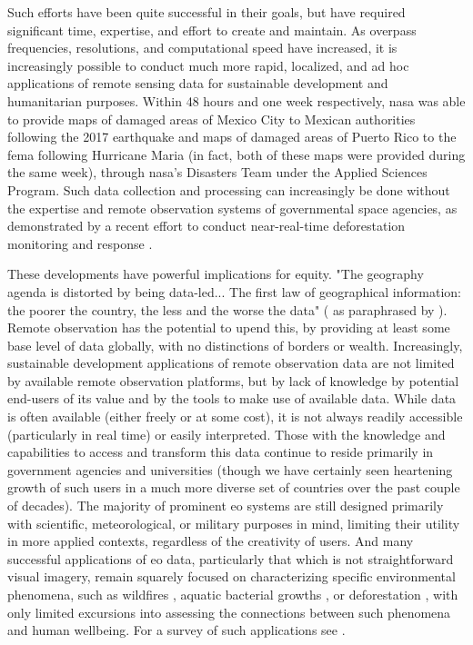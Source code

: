 Such efforts have been quite successful in their goals, but have required significant time, expertise, and effort to create and maintain. As overpass frequencies, resolutions, and computational speed have increased, it is increasingly possible to conduct much more rapid, localized, and ad hoc applications of remote sensing data for sustainable development and humanitarian purposes. Within 48 hours and one week respectively, \ac{nasa} was able to provide maps of damaged areas of Mexico City to Mexican authorities following the 2017 earthquake \cite{nasajetpropulsionlaboratorySatelliteRadarDetects2017} and maps of damaged areas of Puerto Rico to the \ac{fema} following Hurricane Maria \cite{nasajetpropulsionlaboratorySatelliteDataPuerto2017} (in fact, both of these maps were provided during the same week), through \ac{nasa}'s Disasters Team under the Applied Sciences Program. Such data collection and processing can increasingly be done without the expertise and remote observation systems of governmental space agencies, as demonstrated by a recent effort to conduct near-real-time deforestation monitoring and response \cite{finerCombatingDeforestationSatellite2018}.

These developments have powerful implications for equity. "The geography agenda is distorted by being data-led... The first law of geographical information: the poorer the country, the less and the worse the data"  (\cite{overton1991further} as paraphrased by \cite{taylorGeographicInformationSystems1994}). Remote observation has the potential to upend this, by providing at least some base level of data globally, with no distinctions of borders or wealth. Increasingly, sustainable development applications of remote observation data are not limited by available remote observation platforms, but by lack of knowledge by potential end-users of its value and by the tools to make use of available data. While data is often available (either freely or at some cost), it is not always readily accessible (particularly in real time) or easily interpreted. Those with the knowledge and capabilities to access and transform this data continue to reside primarily in government agencies and universities (though we have certainly seen heartening growth of such users in a much more diverse set of countries over the past couple of decades). The majority of prominent \ac{eo} systems are still designed primarily with scientific, meteorological, or military purposes in mind, limiting their utility in more applied contexts, regardless of the creativity of users. And many successful applications of \ac{eo} data, particularly that which is not straightforward visual imagery, remain squarely focused on characterizing specific environmental phenomena, such as wildfires \cite{schroederNewVIIRS375m2014},  aquatic bacterial growths \cite{stromingQuantifyingHumanHealth2020}, or deforestation \cite{lagomasinoMeasuringMangroveCarbon2019}, with only limited excursions into assessing the connections between such phenomena and human wellbeing. For a survey of such applications see \cite{southernhemispheresummerspaceprogram2013CommonHorizonsWhite2013}.

